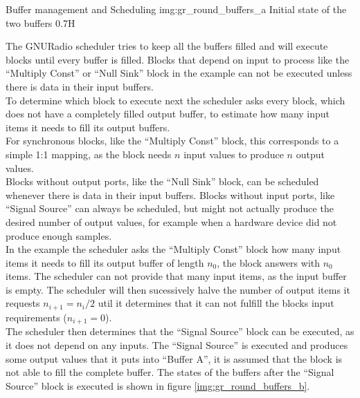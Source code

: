 \begin{subchapter}{Buffer management and Scheduling}
               {img:gr_round_buffers_a}
               {Initial state of the two buffers}
               {0.7}{H}

  The GNURadio scheduler tries to keep all the buffers filled
  and will execute blocks until every buffer is filled.
  Blocks that depend on input to process like the ``Multiply Const''
  or ``Null Sink'' block in the example can not be executed
  unless there is data in their input buffers. \\

  To determine which block to execute next the scheduler
  asks every block, which does not have a completely filled
  output buffer, to estimate how many input items it needs to fill
  its output buffers. \\

  For synchronous blocks, like the ``Multiply Const'' block,
  this corresponds to a simple 1:1 mapping, as the block
  needs $n$ input values to produce $n$ output values. \\

  Blocks without output ports, like the ``Null Sink'' block,
  can be scheduled whenever there is data in their input
  buffers.
  Blocks without input ports, like ``Signal Source'' can
  always be scheduled, but might not actually produce the
  desired number of output values, for example when a
  hardware device did not produce enough samples. \\

  In the example the scheduler asks the ``Multiply Const''
  block how many input items it needs to fill
  its output buffer of length $n_0$, the block answers with
  $n_0$ items.
  The scheduler can not provide that many input items,
  as the input buffer is empty.
  The scheduler will then sucessively halve the number
  of output items it requests $n_{i+1}=n_i/2$ util
  it determines that it can not fulfill the blocks
  input requirements ($n_{i+1}=0$). \\

  The scheduler then determines that the ``Signal Source''
  block can be executed, as it does not depend on any
  inputs.
  The ``Signal Source'' is executed and produces some
  output values that it puts into ``Buffer A'', it is assumed
  that the block is not able to fill the complete buffer.
  The states of the buffers after the ``Signal Source''
  block is executed is shown in figure \ref{img:gr_round_buffers_b}. \\


\end{subchapter}
